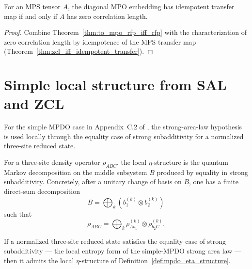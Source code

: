 \begin{theorem}%
    \label{thm:to_mpo_rfp_iff_zcl}
    \leanok
    For an MPS tensor $A$, the diagonal MPO embedding has idempotent transfer
    map if and only if $A$ has zero correlation length.
\end{theorem}

\begin{proof}
    \leanok
    Combine Theorem~\ref{thm:to_mpo_rfp_iff_rfp} with the characterization of
    zero correlation length by idempotence of the MPS transfer map
    (Theorem~\ref{thm:zcl_iff_idempotent_transfer}).
\end{proof}

\section{Simple local structure from SAL and ZCL}

For the simple MPDO case in Appendix~C.2 of \cite{Cirac2016MPDO_arXiv},
the strong-area-law hypothesis is used locally through the equality case of
strong subadditivity for a normalized three-site reduced state.

\begin{definition}
    \label{def:mpdo_eta_structure}
    \leanok
    For a three-site density operator $\rho_{ABC}$, the local $\eta$-structure
    is the quantum Markov decomposition on the middle subsystem $B$ produced by
    equality in strong subadditivity. Concretely, after a unitary change of
    basis on $B$, one has a finite direct-sum decomposition
    \[
        B = \bigoplus_k (b_1^{(k)} \otimes b_2^{(k)})
    \]
    such that
    \[
        \rho_{ABC} = \bigoplus_k \rho_{A b_1}^{(k)} \otimes \rho_{b_2 C}^{(k)}.
    \]
\end{definition}

\begin{theorem}
    \label{thm:sal_implies_eta_structure}
    \leanok
    If a normalized three-site reduced state satisfies the equality case of
    strong subadditivity --- the local entropy form of the simple-MPDO strong
    area law --- then it admits the local $\eta$-structure of
    Definition~\ref{def:mpdo_eta_structure}.
\end{theorem}

